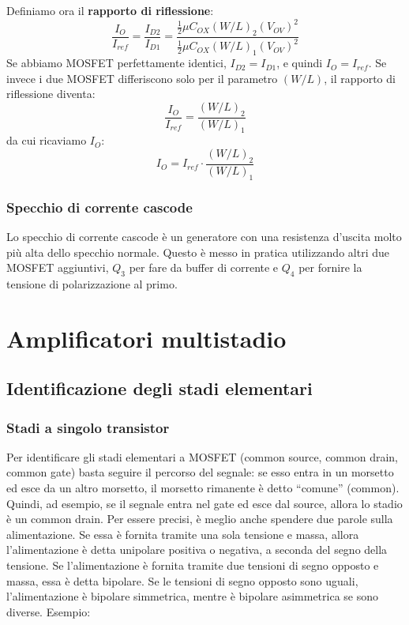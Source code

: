 \documentclass[a4paper,twocolumn,notitlepage]{book}
\begin{document}
	Definiamo ora il \textbf{rapporto di riflessione}:
	\begin{equation}
		\frac{I_O}{I_{ref}}=\frac{I_{D2}}{I_{D1}}=\frac{\frac{1}{2} \mu C_{OX} (W/L)_2 (V_{OV})^2}{\frac{1}{2} \mu C_{OX} (W/L)_1 (V_{OV})^2}
	\end{equation}
	Se abbiamo MOSFET perfettamente identici, $I_{D2}=I_{D1}$, e quindi $I_O=I_{ref}$.\newline
	Se invece i due MOSFET differiscono solo per il parametro $(W/L)$, il rapporto di riflessione diventa:
	\begin{equation}
		\frac{I_O}{I_{ref}}=\frac{(W/L)_2 }{(W/L)_1}
	\end{equation}
	da cui ricaviamo $I_O$:
	\begin{equation}
		I_O=I_{ref} \cdot \frac{(W/L)_2 }{(W/L)_1}
	\end{equation}
	
	\subsubsection*{Specchio di corrente cascode}
	Lo specchio di corrente cascode è un generatore con una resistenza d'uscita molto più alta dello specchio normale. Questo è messo in pratica utilizzando altri due MOSFET aggiuntivi, $Q_3$ per fare da buffer di corrente e $Q_4$ per fornire la tensione di polarizzazione al primo.	
	
	
	\section*{Amplificatori multistadio}
	\subsection*{Identificazione degli stadi elementari}
		\subsubsection*{Stadi a singolo transistor}	
		Per identificare gli stadi elementari a MOSFET (common source, common drain, common gate) basta seguire il percorso del segnale: se esso entra in un morsetto ed esce da un altro morsetto, il morsetto rimanente è detto  ``comune''  (common).
		Quindi, ad esempio, se il segnale entra nel gate ed esce dal source, allora lo stadio è un common drain.
	Per essere precisi, è meglio anche spendere due parole sulla alimentazione. 
Se essa è fornita tramite una sola tensione e massa, allora l'alimentazione è detta unipolare positiva o negativa, a seconda del segno della tensione.  \newline
		Se l'alimentazione è fornita tramite due tensioni di segno opposto e massa, essa è detta bipolare. Se le tensioni di segno opposto sono uguali, l'alimentazione è bipolare simmetrica, mentre è bipolare asimmetrica se sono diverse.
		\newline
		Esempio: \medskip
		
\end{document}
